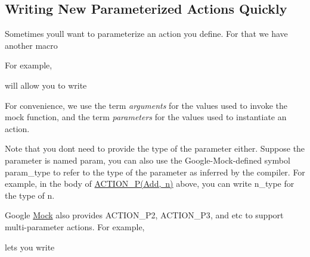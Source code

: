 \subsection*{Writing New Parameterized Actions Quickly}

Sometimes you\textquotesingle{}ll want to parameterize an action you define. For that we have another macro 
\begin{DoxyCode}{0}
\end{DoxyCode}


For example, 
\begin{DoxyCode}{0}
\end{DoxyCode}
 will allow you to write 
\begin{DoxyCode}{0}
\end{DoxyCode}


For convenience, we use the term {\itshape arguments} for the values used to invoke the mock function, and the term {\itshape parameters} for the values used to instantiate an action.

Note that you don\textquotesingle{}t need to provide the type of the parameter either. Suppose the parameter is named {\ttfamily param}, you can also use the Google-\/\+Mock-\/defined symbol {\ttfamily param\+\_\+type} to refer to the type of the parameter as inferred by the compiler. For example, in the body of {\ttfamily \mbox{\hyperlink{_obj__test_2lib_2googletest-release-1_88_81_2googlemock_2include_2gmock_2gmock-generated-actions_8h_a8ee9766f611f068271ca37a90c0e5960}{A\+C\+T\+I\+O\+N\+\_\+\+P(\+Add, n)}}} above, you can write {\ttfamily n\+\_\+type} for the type of {\ttfamily n}.

Google \mbox{\hyperlink{class_mock}{Mock}} also provides {\ttfamily A\+C\+T\+I\+O\+N\+\_\+\+P2}, {\ttfamily A\+C\+T\+I\+O\+N\+\_\+\+P3}, and etc to support multi-\/parameter actions. For example, 
\begin{DoxyCode}{0}
\DoxyCodeLine{\}}
\end{DoxyCode}
 lets you write 
\begin{DoxyCode}{0}
\end{DoxyCode}


